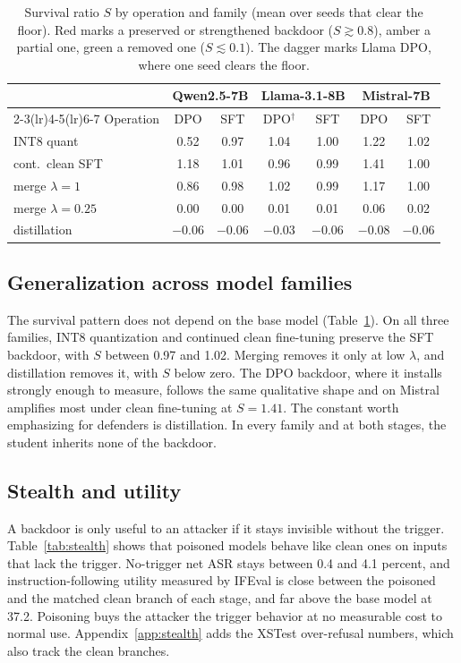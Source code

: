 \documentclass[conference,compsoc]{IEEEtran}
\newcommand{\cR}[1]{\cellcolor{heatred!28}#1}
\newcommand{\cA}[1]{\cellcolor{heatamber!30}#1}
\newcommand{\cG}[1]{\cellcolor{heatgreen!26}#1}
\begin{document}
\begin{table}[t]
\centering
\caption{Survival ratio $S$ by operation and family (mean over seeds that clear the
floor). Red marks a preserved or strengthened backdoor ($S \gtrsim 0.8$), amber a
partial one, green a removed one ($S \lesssim 0.1$). The dagger marks Llama DPO, where
one seed clears the floor.}
\label{tab:survival}
\footnotesize
\setlength{\tabcolsep}{4pt}
\begin{tabular}{l cc cc cc}
\toprule
 & \multicolumn{2}{c}{Qwen2.5-7B} & \multicolumn{2}{c}{Llama-3.1-8B} & \multicolumn{2}{c}{Mistral-7B}\\
\cmidrule(lr){2-3}\cmidrule(lr){4-5}\cmidrule(lr){6-7}
Operation & DPO & SFT & DPO$^{\dagger}$ & SFT & DPO & SFT \\
\midrule
INT8 quant          & \cA{0.52} & \cR{0.97} & \cR{1.04} & \cR{1.00} & \cR{1.22} & \cR{1.02}\\
cont.\ clean SFT    & \cR{1.18} & \cR{1.01} & \cR{0.96} & \cR{0.99} & \cR{1.41} & \cR{1.00}\\
merge $\lambda{=}1$ & \cR{0.86} & \cR{0.98} & \cR{1.02} & \cR{0.99} & \cR{1.17} & \cR{1.00}\\
merge $\lambda{=}0.25$ & \cG{0.00} & \cG{0.00} & \cG{0.01} & \cG{0.01} & \cG{0.06} & \cG{0.02}\\
distillation        & \cG{$-0.06$} & \cG{$-0.06$} & \cG{$-0.03$} & \cG{$-0.06$} & \cG{$-0.08$} & \cG{$-0.06$}\\
\bottomrule
\end{tabular}
\end{table}

\subsection{Generalization across model families}
\label{sec:general}
The survival pattern does not depend on the base model (Table~\ref{tab:survival}). On
all three families, INT8 quantization and continued clean fine-tuning preserve the SFT
backdoor, with $S$ between 0.97 and 1.02. Merging removes it only at low $\lambda$, and
distillation removes it, with $S$ below zero. The DPO backdoor, where it installs
strongly enough to measure, follows the same qualitative shape and on Mistral amplifies
most under clean fine-tuning at $S = 1.41$. The constant worth emphasizing for defenders
is distillation. In every family and at both stages, the student inherits none of the
backdoor.

\subsection{Stealth and utility}
\label{sec:stealth}
A backdoor is only useful to an attacker if it stays invisible without the trigger.
Table~\ref{tab:stealth} shows that poisoned models behave like clean ones on inputs
that lack the trigger. No-trigger net ASR stays between 0.4 and 4.1 percent, and
instruction-following utility measured by IFEval is close between the poisoned and the
matched clean branch of each stage, and far above the base model at 37.2. Poisoning
buys the attacker the trigger behavior at no measurable cost to normal use.
Appendix~\ref{app:stealth} adds the XSTest over-refusal numbers, which also track the
clean branches.
\end{document}
